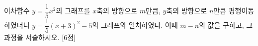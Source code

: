 이차함수 $y=\dfrac{1}{5}x^2$의 그래프를 $x$축의 방향으로 $m$만큼, $y$축의 방향으로 $n$만큼 평행이동하였더니 $y=\dfrac{1}{5}(x+3)^2-5$의 그래프와 일치하였다. 이때 $m-n$의 값을 구하고, 그 과정을 서술하시오. \mbox{[6점]}
